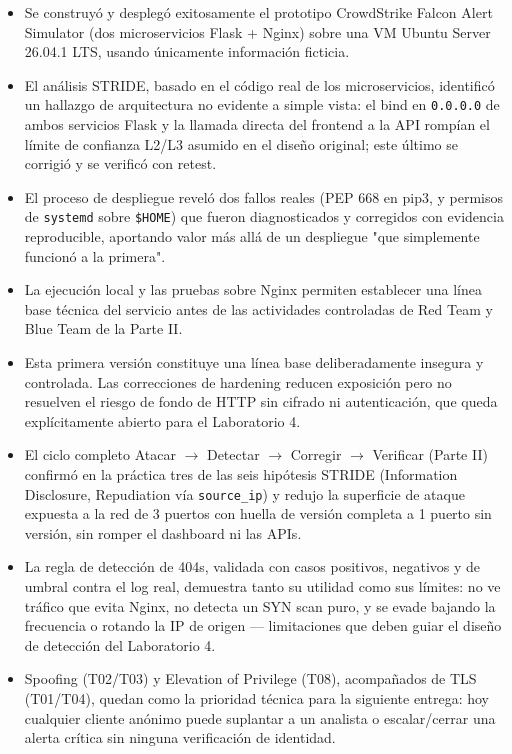 \documentclass[journal]{IEEEtran}
\begin{document}
\begin{itemize}

    \item Se construyó y desplegó exitosamente el prototipo CrowdStrike Falcon
    Alert Simulator (dos microservicios Flask + Nginx) sobre una VM Ubuntu
    Server 26.04.1 LTS, usando únicamente información ficticia.

    \item El análisis STRIDE, basado en el código real de los microservicios,
    identificó un hallazgo de arquitectura no evidente a simple vista: el
    bind en \texttt{0.0.0.0} de ambos servicios Flask y la llamada directa
    del frontend a la API rompían el límite de confianza L2/L3 asumido en el
    diseño original; este último se corrigió y se verificó con retest.

    \item El proceso de despliegue reveló dos fallos reales (PEP 668 en
    pip3, y permisos de \texttt{systemd} sobre \texttt{\$HOME}) que fueron
    diagnosticados y corregidos con evidencia reproducible, aportando valor
    más allá de un despliegue "que simplemente funcionó a la primera".

    \item La ejecución local y las pruebas sobre Nginx permiten establecer una
    línea base técnica del servicio antes de las actividades controladas de
    Red Team y Blue Team de la Parte II.

    \item Esta primera versión constituye una línea base deliberadamente
    insegura y controlada. Las correcciones de hardening reducen exposición
    pero no resuelven el riesgo de fondo de HTTP sin cifrado ni autenticación,
    que queda explícitamente abierto para el Laboratorio 4.

    \item El ciclo completo Atacar $\rightarrow$ Detectar $\rightarrow$
    Corregir $\rightarrow$ Verificar (Parte II) confirmó en la práctica tres
    de las seis hipótesis STRIDE (Information Disclosure, Repudiation vía
    \texttt{source\_ip}) y redujo la superficie de ataque expuesta a la red
    de 3 puertos con huella de versión completa a 1 puerto sin versión, sin
    romper el dashboard ni las APIs.

    \item La regla de detección de 404s, validada con casos positivos,
    negativos y de umbral contra el log real, demuestra tanto su utilidad
    como sus límites: no ve tráfico que evita Nginx, no detecta un SYN scan
    puro, y se evade bajando la frecuencia o rotando la IP de origen ---
    limitaciones que deben guiar el diseño de detección del Laboratorio 4.

    \item Spoofing (T02/T03) y Elevation of Privilege (T08), acompañados de
    TLS (T01/T04), quedan como la prioridad técnica para la siguiente
    entrega: hoy cualquier cliente anónimo puede suplantar a un analista o
    escalar/cerrar una alerta crítica sin ninguna verificación de identidad.

\end{itemize}
\end{document}
